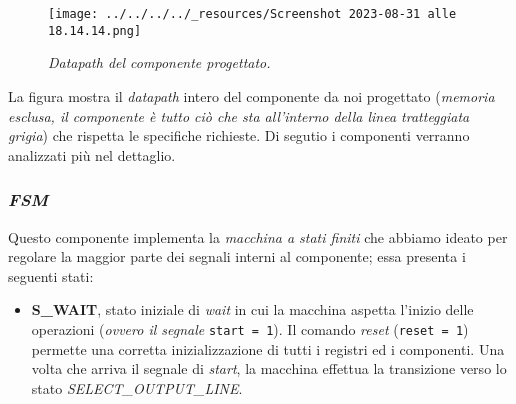 \begin{figure}
\centering
\texttt{[image: ../../../../\_resources/Screenshot 2023-08-31 alle 18.14.14.png]}
\caption{\emph{Datapath del componente progettato.}}
\end{figure}

La figura mostra il \emph{datapath} intero del componente da noi
progettato (\emph{memoria esclusa, il componente è tutto ciò che sta
all'interno della linea tratteggiata grigia}) che rispetta le specifiche
richieste. Di segutio i componenti verranno analizzati più nel
dettaglio.

\hypertarget{fsm}{%
\subsubsection{\texorpdfstring{\emph{FSM}}{FSM}}\label{fsm}}

Questo componente implementa la \emph{macchina a stati finiti} che
abbiamo ideato per regolare la maggior parte dei segnali interni al
componente; essa presenta i seguenti stati:

\begin{itemize}
\tightlist
\item
  \textbf{S\_WAIT}, stato iniziale di \emph{wait} in cui la macchina
  aspetta l'inizio delle operazioni (\emph{ovvero il segnale}
  \texttt{start\ =\ 1}). Il comando \emph{reset} (\texttt{reset\ =\ 1})
  permette una corretta inizializzazione di tutti i registri ed i
  componenti. Una volta che arriva il segnale di \emph{start}, la
  macchina effettua la transizione verso lo stato
  \emph{SELECT\_OUTPUT\_LINE}.
\end{itemize}

\pagebreak

